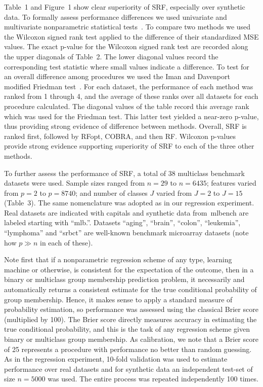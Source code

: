 \documentclass{bmcart}
\def\RFopt{RFopt}
\begin{document}
Table~1 and Figure~1 show clear superiority of SRF, especially over
synthetic data.  To formally assess performance differences we used
univariate and multivariate nonparametric statistical
tests~\cite{Demsar:2006}.  To compare two methods we used the Wilcoxon
signed rank test applied to the difference of their standardized MSE
values.  The exact p-value for the Wilcoxon signed rank test are
recorded along the upper diagonals of Table~2.  The lower diagonal
values record the corresponding test statistic where small values
indicate a difference.  To test for an overall difference among
procedures we used the Iman and Davenport modified Friedman
test~\cite{Demsar:2006}.  For each dataset, the performance of each
method was ranked from 1 through 4, and the average of these ranks
over all datasets for each procedure calculated.  The diagonal values
of the table record this average rank which was used for the Friedman
test.  This latter test yielded a near-zero p-value, thus providing
strong evidence of difference between methods.  Overall, SRF is ranked
first, followed by \RFopt, COBRA, and then RF.  Wilcoxon p-values
provide strong evidence supporting superiority of SRF to each of the
three other methods.


\vskip10pt

\noindent To further assess the performance of SRF, a total of 38
multiclass benchmark datasets were used.  Sample sizes ranged from
$n=29$ to $n=6435$; features varied from $p=2$ to $p=8740$; and number
of classes $J$ varied from $J=2$ to $J=15$ (Table~3).  The same
nomenclature was adopted as in our regression experiment.  Real
datasets are indicated with capitals and synthetic data
from~{\ttfamily mlbench} are labeled starting with ``mlb.''.  Datasets
``aging'', ``brain'', ``colon'', ``leukemia'', ``lymphoma'' and
``srbct'' are well-known benchmark microarray datasets (note how $p\gg
n$ in each of these).

Note first that if a nonparametric regression scheme of any type,
learning machine or otherwise, is consistent for the expectation of
the outcome, then in a binary or multiclass group membership
prediction problem, it necessarily and automatically returns a
consistent estimate for the true conditional probability of group
membership. Hence, it makes sense to apply a standard measure of
probability estimation, so performance was assessed using the
classical Brier score (multiplied by 100). The Brier score directly
measures accuracy in estimating the true conditional probability, and
this is the task of any regression scheme given binary or multiclass
group membership.  As calibration, we note that a Brier score of 25
represents a procedure with performance no better than random
guessing.  As in the regression experiment, 10-fold validation was
used to estimate performance over real datasets and for synthetic data
an independent test-set of size $n=5000$ was used.  The entire process
was repeated independently 100 times.
\end{document}
